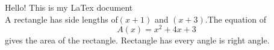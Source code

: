 \documentclass[12pt]{article}
\begin{document}
Hello! This is my LaTex document\\
A rectangle has side lengths of$(x+1)$ and $(x+3)$.The equation of $${A(x)=x^2+4x+3}$$ gives the area of the rectangle.
Rectangle has every angle is right angle.
\end{document}
